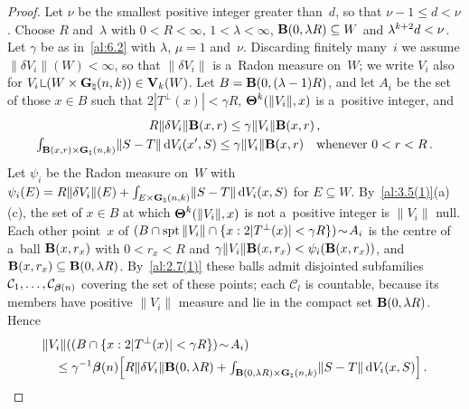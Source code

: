 \begin{proof}
    Let $\nu$ be the smallest positive integer greater than~$d$, so that $\nu - 1 \le d < \nu$.
    Choose $R$ and~$\lambda$ with $0 < R < \infty$, $1 < \lambda < \infty$, $\mathbf{B}(0,\lambda
    R) \subseteq W$ and $\lambda^{k+2} d < \nu$. Let $\gamma$ be as in~\ref{al:6.2} with
    $\lambda$, $\mu = 1$ and~$\nu$. Discarding finitely many~$i$ we assume $\|\delta V_i\|(W) <
    \infty$, so that $\|\delta V_i\|$ is a~Radon measure on~$W$; we write $V_i$ also for $V_i
    \restrict (W \times \pgrass{\adim}{\vdim}) \in \Var{\vdim}(W)$. Let $B = \mathbf{B}(0,(\lambda -
    1) R)$, and let $A_i$ be the set of those $x \in B$ such that $2 |T^\perp(x)| < \gamma R$,
    $\boldsymbol{\Theta}^{k}(\|V_i\|,x)$ is a~positive integer, and
    \begin{gather*}
        R \|\delta V_i\| \mathbf{B}(x,r) \le \gamma \|V_i\| \mathbf{B}(x,r) \,, \\
        {\textstyle\int_{\mathbf{B}(x,r) \times \mathbf{G}_{\natural}(n,k)}^{}} \|S - T\| \,\mathrm{d} V_i(x',S) \le \gamma
        \|V_i\| \mathbf{B}(x,r) \quad \text{whenever $0 < r < R$} \,.
    \end{gather*}
    Let $\psi_i$ be the Radon measure on~$W$ with $\psi_i(E) = R \|\delta V_i\|(E) +
    {\textstyle\int_{E \times \mathbf{G}_{\natural}(n,k)}^{}} \|S - T\| \,\mathrm{d} V_i(x,S)$ for $E \subseteq W$.
    By~\ref{al:3.5(1)}(a)(c), the set of $x \in B$ at which $\boldsymbol{\Theta}^{k}(\|V_i\|,x)$ is not
    a~positive integer is $\|V_i\|$ null. Each other point~$x$ of $(B \cap \operatorname{spt} \|V_i\| \cap \{ x
    : 2 |T^\perp(x)| < \gamma R \}) \!\sim\! A_i$ is the centre of a~ball $\mathbf{B}(x,r_x)$ with
    $0 < r_x < R$ and $\gamma \|V_i\| \mathbf{B}(x,r_x) < \psi_i(\mathbf{B}(x,r_x))$, and
    $\mathbf{B}(x,r_x) \subseteq \mathbf{B}(0,\lambda R)$. By~\ref{al:2.7(1)} these balls admit
    disjointed subfamilies $\mathcal{C}_1, \ldots, \mathcal{C}_{\boldsymbol{\beta}(n)}$ covering
    the set of these points; each $\mathcal{C}_l$ is countable, because its members have positive
    $\|V_i\|$ measure and lie in the compact set $\mathbf{B}(0,\lambda R)$. Hence
    \begin{equation}
        \label{eq:6.3:1}
        \begin{multlined}
        \|V_i\|((B \cap \{ x : 2 |T^\perp(x)| < \gamma R \}) \without A_i) \\ \le \gamma^{-1}
        \besicovitch{\adim} \Big[ R \|\delta V_i\| \cball{0}{\lambda R} + \textint{\cball{0}{\lambda
        R} \times \pgrass{\adim}{\vdim}}{} \|S - T\| \ud V_i(x,S) \Big] \,.
        \end{multlined}

\end{equation}
\end{proof}
